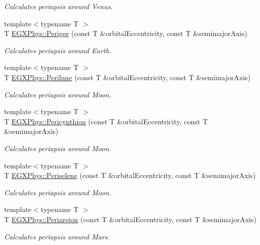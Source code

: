 \begin{DoxyCompactItemize}
\begin{DoxyCompactList}\small\item\em Calculates periapsis around Venus. \end{DoxyCompactList}\item 
{\footnotesize template$<$typename T $>$ }\\T \mbox{\hyperlink{group___periapsis_gae2d053caf69cb0b4c3207064a2ab143a}{E\+G\+X\+Phys\+::\+Perigee}} (const T \&orbital\+Eccentricity, const T \&semimajor\+Axis)
\begin{DoxyCompactList}\small\item\em Calculates periapsis around Earth. \end{DoxyCompactList}\item 
{\footnotesize template$<$typename T $>$ }\\T \mbox{\hyperlink{group___periapsis_ga2cc7ab05e18d32c94d8d74972e032793}{E\+G\+X\+Phys\+::\+Perilune}} (const T \&orbital\+Eccentricity, const T \&semimajor\+Axis)
\begin{DoxyCompactList}\small\item\em Calculates periapsis around Moon. \end{DoxyCompactList}\item 
{\footnotesize template$<$typename T $>$ }\\T \mbox{\hyperlink{group___periapsis_gaeeba153b188cd06cbd233eaef12f0a6a}{E\+G\+X\+Phys\+::\+Pericynthion}} (const T \&orbital\+Eccentricity, const T \&semimajor\+Axis)
\begin{DoxyCompactList}\small\item\em Calculates periapsis around Moon. \end{DoxyCompactList}\item 
{\footnotesize template$<$typename T $>$ }\\T \mbox{\hyperlink{group___periapsis_ga255874374dde571531e443cdbef9ef0c}{E\+G\+X\+Phys\+::\+Periselene}} (const T \&orbital\+Eccentricity, const T \&semimajor\+Axis)
\begin{DoxyCompactList}\small\item\em Calculates periapsis around Moon. \end{DoxyCompactList}\item 
{\footnotesize template$<$typename T $>$ }\\T \mbox{\hyperlink{group___periapsis_ga0617ba07a30b0fd0544c02f691bfae26}{E\+G\+X\+Phys\+::\+Periareion}} (const T \&orbital\+Eccentricity, const T \&semimajor\+Axis)
\begin{DoxyCompactList}\small\item\em Calculates periapsis around Mars. \end{DoxyCompactList}\item 

\end{DoxyCompactItemize}
